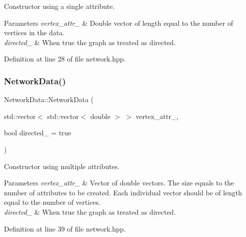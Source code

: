 Constructor using a single attribute. 


\begin{DoxyParams}{Parameters}
{\em vertex\+\_\+attr\+\_\+} & Double vector of length equal to the number of vertices in the data. \\
\hline
{\em directed\+\_\+} & When {\ttfamily true} the graph as treated as directed. \\
\hline
\end{DoxyParams}


Definition at line 28 of file network.\+hpp.

\mbox{\label{class_network_data_ac4b5a740d40bc84695653c3e3499ac65}} 
\subsubsection{\texorpdfstring{Network\+Data()}{NetworkData()}\hspace{0.1cm}{\footnotesize\ttfamily [3/3]}}
{\footnotesize\ttfamily Network\+Data\+::\+Network\+Data (\begin{DoxyParamCaption}\item[{std\+::vector$<$ std\+::vector$<$ double $>$ $>$}]{vertex\+\_\+attr\+\_\+,  }\item[{bool}]{directed\+\_\+ = {\ttfamily true} }\end{DoxyParamCaption})\hspace{0.3cm}{\ttfamily [inline]}}



Constructor using multiple attributes. 


\begin{DoxyParams}{Parameters}
{\em vertex\+\_\+attr\+\_\+} & Vector of double vectors. The size equals to the number of attributes to be created. Each individual vector should be of length equal to the number of vertices. \\
\hline
{\em directed\+\_\+} & When {\ttfamily true} the graph as treated as directed. \\
\hline
\end{DoxyParams}


Definition at line 39 of file network.\+hpp.

\mbox{\label{class_network_data_a4667137d76017d3c69a789ad6cf86931}} 
